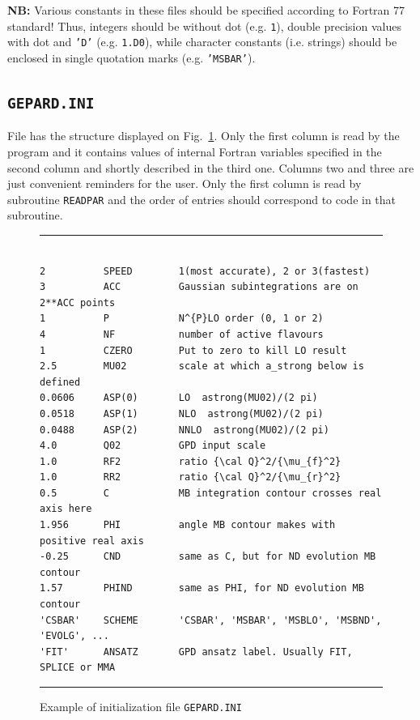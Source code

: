 \documentclass[12pt]{article}
\begin{document}
\textbf{NB:} Various constants in these files should be specified
according to Fortran 77 standard! Thus, integers should be without dot (e.g.
\texttt{1}), double precision values with dot and \texttt{'D'} (e.g.
\texttt{1.D0}), while character constants (i.e. strings) should be enclosed in
single quotation marks (e.g. \texttt{'MSBAR'}).

\subsection{\texttt{GEPARD.INI}}
\label{ssect:GEPARD.INI}

File has the structure displayed on Fig.~\ref{fig:GEPARD.INI}.
Only the first column is read by the program and it contains
values of internal Fortran variables specified in the second column and
shortly described in the third one. 
Columns two and three are just convenient reminders for the user. 
Only the first column is read by subroutine \texttt{READPAR} and the
order of entries should correspond to code in that subroutine.  
\begin{figure}[t]
\begin{center}
\hrule
\begin{verbatim}

2          SPEED        1(most accurate), 2 or 3(fastest)
3          ACC          Gaussian subintegrations are on 2**ACC points 
1          P            N^{P}LO order (0, 1 or 2)
4          NF           number of active flavours
1          CZERO        Put to zero to kill LO result
2.5        MU02         scale at which a_strong below is defined
0.0606     ASP(0)       LO  astrong(MU02)/(2 pi)
0.0518     ASP(1)       NLO  astrong(MU02)/(2 pi)
0.0488     ASP(2)       NNLO  astrong(MU02)/(2 pi)
4.0        Q02          GPD input scale
1.0        RF2          ratio {\cal Q}^2/{\mu_{f}^2}
1.0        RR2          ratio {\cal Q}^2/{\mu_{r}^2}
0.5        C            MB integration contour crosses real axis here
1.956      PHI          angle MB contour makes with positive real axis
-0.25      CND          same as C, but for ND evolution MB contour
1.57       PHIND        same as PHI, for ND evolution MB contour
'CSBAR'    SCHEME       'CSBAR', 'MSBAR', 'MSBLO', 'MSBND', 'EVOLG', ...
'FIT'      ANSATZ       GPD ansatz label. Usually FIT, SPLICE or MMA

\end{verbatim}
\hrule
\end{center}
\caption{Example of initialization file \texttt{GEPARD.INI}}
\label{fig:GEPARD.INI}
\end{figure}
\end{document}
